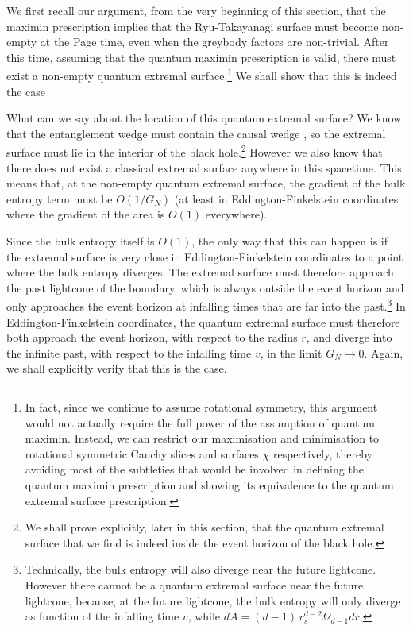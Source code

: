 \documentclass[12pt]{article}
\begin{document}
We first recall our argument, from the very beginning of this section, that the maximin prescription implies that the Ryu-Takayanagi surface must become non-empty at the Page time, even when the greybody factors are non-trivial. After this time, assuming that the quantum maximin prescription is valid, there must exist a non-empty quantum extremal surface.\footnote{In fact, since we continue to assume rotational symmetry, this argument would not actually require the full power of the assumption of quantum maximin. Instead, we can restrict our maximisation and minimisation to rotational symmetric Cauchy slices and surfaces $\chi$ respectively, thereby avoiding most of the subtleties that would be involved in defining the quantum maximin prescription and showing its equivalence to the quantum extremal surface prescription.} We shall show that this is indeed the case

What can we say about the location of this quantum extremal surface? We know that the entanglement wedge must contain the causal wedge \cite{engelhardt2015quantum}, so the extremal surface must lie in the interior of the black hole.\footnote{We shall prove explicitly, later in this section, that the quantum extremal surface that we find is indeed inside the event horizon of the black hole.} However we also know that there does not exist a classical extremal surface anywhere in this spacetime. This means that, at the non-empty quantum extremal surface, the gradient of the bulk entropy term must be $O(1/G_N)$ (at least in Eddington-Finkelstein coordinates where the gradient of the area is $O(1)$ everywhere). 

Since the bulk entropy itself is $O(1)$, the only way that this can happen is if the extremal surface is very close in Eddington-Finkelstein coordinates to a point where the bulk entropy diverges. The extremal surface must therefore approach the past lightcone of the boundary, which is always outside the event horizon and only approaches the event horizon at infalling times that are far into the past.\footnote{Technically, the bulk entropy will also diverge near the future lightcone. However there cannot be a quantum extremal surface near the future lightcone, because, at the future lightcone, the bulk entropy will only diverge as function of the infalling time $v$, while $dA = (d-1)\, r_s^{d-2} \Omega_{d-1} dr$.} In Eddington-Finkelstein coordinates, the quantum extremal surface must therefore both approach the event horizon, with respect to the radius $r$, and diverge into the infinite past, with respect to the infalling time $v$, in the limit $G_N \to 0$. Again, we shall explicitly verify that this is the case. 
\end{document}
